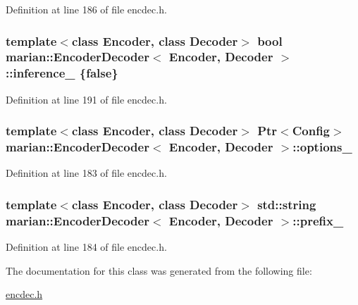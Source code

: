 Definition at line 186 of file encdec.\+h.

\subsubsection[{\texorpdfstring{inference\+\_\+}{inference_}}]{\setlength{\rightskip}{0pt plus 5cm}template$<$class Encoder, class Decoder$>$ bool {\bf marian\+::\+Encoder\+Decoder}$<$ Encoder, Decoder $>$\+::inference\+\_\+ \{false\}\hspace{0.3cm}{\ttfamily [protected]}}\hypertarget{classmarian_1_1EncoderDecoder_a51626185014f44e369ca9ea8b9da7c10}{}\label{classmarian_1_1EncoderDecoder_a51626185014f44e369ca9ea8b9da7c10}


Definition at line 191 of file encdec.\+h.

\subsubsection[{\texorpdfstring{options\+\_\+}{options_}}]{\setlength{\rightskip}{0pt plus 5cm}template$<$class Encoder, class Decoder$>$ {\bf Ptr}$<${\bf Config}$>$ {\bf marian\+::\+Encoder\+Decoder}$<$ Encoder, Decoder $>$\+::options\+\_\+\hspace{0.3cm}{\ttfamily [protected]}}\hypertarget{classmarian_1_1EncoderDecoder_a467e7d547bd7888d1bea248e99cef212}{}\label{classmarian_1_1EncoderDecoder_a467e7d547bd7888d1bea248e99cef212}


Definition at line 183 of file encdec.\+h.

\subsubsection[{\texorpdfstring{prefix\+\_\+}{prefix_}}]{\setlength{\rightskip}{0pt plus 5cm}template$<$class Encoder, class Decoder$>$ std\+::string {\bf marian\+::\+Encoder\+Decoder}$<$ Encoder, Decoder $>$\+::prefix\+\_\+\hspace{0.3cm}{\ttfamily [protected]}}\hypertarget{classmarian_1_1EncoderDecoder_aeccce58b4406c58abd7ad596ff6b8eae}{}\label{classmarian_1_1EncoderDecoder_aeccce58b4406c58abd7ad596ff6b8eae}


Definition at line 184 of file encdec.\+h.



The documentation for this class was generated from the following file\+:\begin{DoxyCompactItemize}
\item 
\hyperlink{encdec_8h}{encdec.\+h}\end{DoxyCompactItemize}
